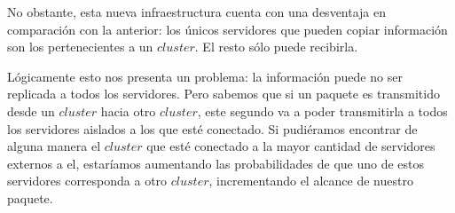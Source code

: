 \par{No obstante, esta nueva infraestructura cuenta con una desventaja en comparación con la anterior: los únicos servidores que pueden copiar información son los pertenecientes a un $cluster$. El resto sólo puede recibirla.}\\

\par{Lógicamente esto nos presenta un problema: la información puede no ser replicada a todos los servidores. Pero sabemos que si un paquete es transmitido desde un $cluster$ hacia otro $cluster$, este segundo va a poder transmitirla a todos los servidores aislados a los que esté conectado. Si pudiéramos encontrar de alguna manera el $cluster$ que esté conectado a la mayor cantidad de servidores externos a el, estaríamos aumentando las probabilidades de que uno de estos servidores corresponda a otro $cluster$, incrementando el alcance de nuestro paquete.}
